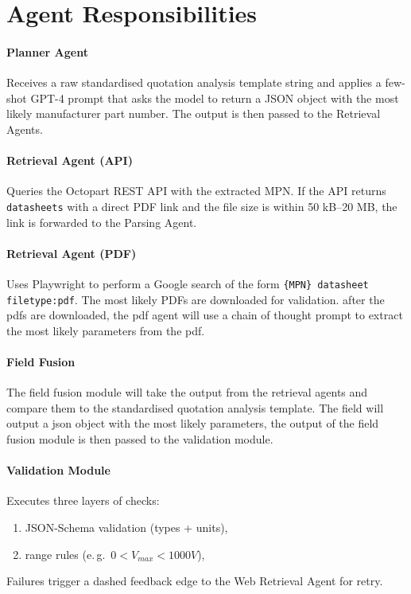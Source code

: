 \section{Agent Responsibilities}
\paragraph{Planner Agent}  
Receives a raw standardised quotation analysis template string and applies a few-shot GPT-4 prompt that asks the model to return a JSON object with the most likely manufacturer part number.
The output is then passed to the Retrieval Agents.


\paragraph{Retrieval Agent (API)}  
Queries the Octopart REST API with the extracted MPN.  
If the API returns \verb|datasheets| with a direct PDF link and the file size is within 50 kB–20 MB, the link is forwarded to the Parsing Agent.

\paragraph{Retrieval Agent (PDF)}  
Uses Playwright to perform a Google search of the form  
\texttt{\{MPN\} datasheet filetype:pdf}.  
The most likely PDFs are downloaded for validation.
after the pdfs are downloaded, the pdf agent will use a chain of thought prompt to extract the most likely parameters from the pdf.

\paragraph{Field Fusion}
The field fusion module will take the output from the retrieval agents and compare them to the standardised quotation analysis template.
The field will output a json object with the most likely parameters, the output of the field fusion module is then passed to the validation module.

\paragraph{Validation Module}  
Executes three layers of checks:
\begin{enumerate}
  \item JSON-Schema validation (types + units),
  \item range rules (e.\,g.\ $0 < V_{max} < 1000V$),
\end{enumerate}  
Failures trigger a dashed feedback edge to the Web Retrieval Agent for retry.

